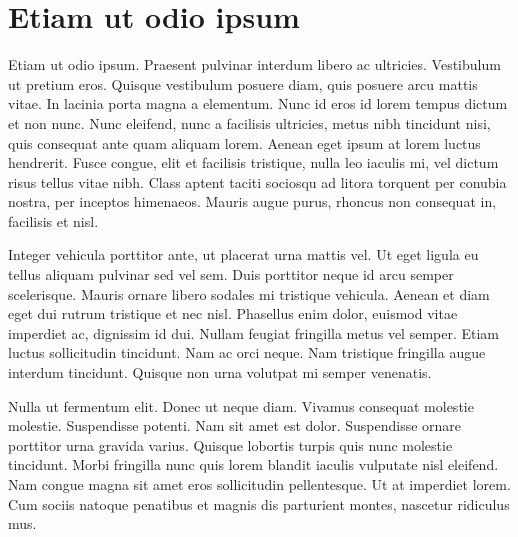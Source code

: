 \section*{Etiam ut odio ipsum}
Etiam ut odio ipsum.
Praesent pulvinar interdum libero ac ultricies.
Vestibulum ut pretium eros.
Quisque vestibulum posuere diam, quis posuere arcu mattis vitae.
In lacinia porta magna a elementum.
Nunc id eros id lorem tempus dictum et non nunc.
Nunc eleifend, nunc a facilisis ultricies, metus nibh tincidunt nisi, quis consequat ante quam aliquam lorem.
Aenean eget ipsum at lorem luctus hendrerit.
Fusce congue, elit et facilisis tristique, nulla leo iaculis mi, vel dictum risus tellus vitae nibh.
Class aptent taciti sociosqu ad litora torquent per conubia nostra, per inceptos himenaeos.
Mauris augue purus, rhoncus non consequat in, facilisis et nisl.

Integer vehicula porttitor ante, ut placerat urna mattis vel.
Ut eget ligula eu tellus aliquam pulvinar sed vel sem.
Duis porttitor neque id arcu semper scelerisque.
Mauris ornare libero sodales mi tristique vehicula.
Aenean et diam eget dui rutrum tristique et nec nisl.
Phasellus enim dolor, euismod vitae imperdiet ac, dignissim id dui.
Nullam feugiat fringilla metus vel semper.
Etiam luctus sollicitudin tincidunt.
Nam ac orci neque.
Nam tristique fringilla augue interdum tincidunt.
Quisque non urna volutpat mi semper venenatis.

Nulla ut fermentum elit.
Donec ut neque diam.
Vivamus consequat molestie molestie.
Suspendisse potenti.
Nam sit amet est dolor.
Suspendisse ornare porttitor urna gravida varius.
Quisque lobortis turpis quis nunc molestie tincidunt.
Morbi fringilla nunc quis lorem blandit iaculis vulputate nisl eleifend.
Nam congue magna sit amet eros sollicitudin pellentesque.
Ut at imperdiet lorem.
Cum sociis natoque penatibus et magnis dis parturient montes, nascetur ridiculus mus.
